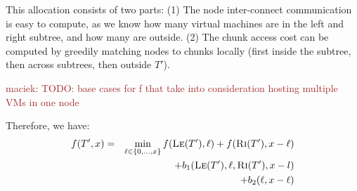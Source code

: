 \documentclass[9pt]{sigcomm-alternate}
\newcommand{\maciek}[1]{\textcolor{brown}{maciek: #1}}
\newcommand{\CostTrans}{\ensuremath{b_1}}
\newcommand{\CostCom}{\ensuremath{b_2}}
\begin{document}
This allocation consists of two parts: (1) The node inter-connect
communication is easy to compute, as we know how many
virtual machines are in the left and right subtree, and how many are 
outside. 
(2) The chunk access cost
can be computed by greedily matching nodes to chunks locally (first
inside the subtree, then across subtrees, then outside $T'$).



%

\maciek{TODO: base cases for f that take into consideration hosting
  multiple VMs in one node}

Therefore, we have:
\begin{eqnarray*}
f(T', x) &=& \min_{\ell \in \{0, \ldots, x\}}  f(\textsc{Le}(T'), {\ell}) + f(\textsc{Ri}(T'), x - {\ell}) \\
&&+ \CostTrans(\textsc{Le}(T'),{\ell},\textsc{Ri}(T'),x-l)\\ &&+ \CostCom({\ell},x-{\ell})\\
\end{eqnarray*}
\end{document}

